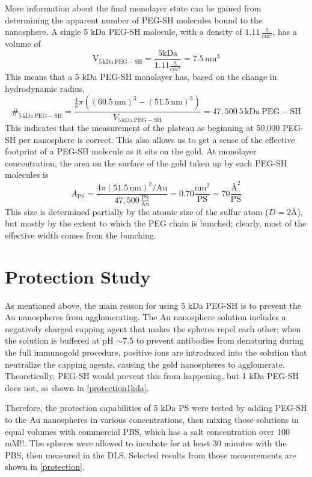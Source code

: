 More information about the final monolayer state can be gained from determining the apparent number of PEG-SH molecules bound to the nanosphere. A single 5 kDa PEG-SH molecule, with a density of $1.11\,\mathrm{\frac{g}{cm^3}}$, has a volume of
\[\mathrm{V_{5\,kDa\ PEG-SH}}
=\frac{5\mathrm{kDa}}{1.11\frac{\mathrm g}{\mathrm cm^3}}=7.5\mathrm{\,nm^3}\]
This means that a 5 kDa PEG-SH monolayer has, based on the change in hydrodynamic radius,
\[\#_{\mathrm{5\,kDa\ PEG-SH}}=
\frac{\frac{4}{3}\pi((60.5\mathrm{\,nm})^3-(51.5\mathrm{\,nm})^3)} {V_{\mathrm{5\,kDa\ PEG-SH}}}=47,500\mathrm{\ 5\,kDa\ PEG-SH}\]
This indicates that the measurement of the plateau as beginning at 50,000 PEG-SH per nanosphere is correct. This also allows us to get a sense of the effective footprint of a PEG-SH molecule as it sits on the gold. At monolayer concentration, the area on the surface of the gold taken up by each PEG-SH molecules is
\[A_{\mathrm{PS}}=\frac{4\pi(51.5\mathrm{\,nm})^2/\mathrm{Au}} {47,500\,\mathrm{\frac{PS}{Au}}}=0.70\frac{\mathrm{nm}^2}{\mathrm{PS}}=70\frac{\text{\AA}^2}{\mathrm{PS}}\]
This size is determined partially by the atomic size of the sulfur atom ($D=2\text{\AA}$), but mostly by the extent to which the PEG chain is bunched; clearly, most of the effective width comes from the bunching.

\section{Protection Study}
\label{protectionstudy}

As mentioned above, the main reason for using 5 kDa PEG-SH is to prevent the Au nanospheres from agglomerating. The Au nanosphere solution includes a negatively charged capping agent that makes the spheres repel each other; when the solution is buffered at pH \ensuremath{\sim}7.5 to prevent antibodies from denaturing during the full immunogold procedure, positive ions are introduced into the solution that neutralize the capping agents, causing the gold nanospheres to agglomerate. Theoretically, PEG-SH would prevent this from happening, but 1 kDa PEG-SH does not, as shown in \autoref{protection1kda}.

Therefore, the protection capabilities of 5 kDa PS were tested by adding PEG-SH to the Au nanospheres in various concentrations, then mixing those solutions in equal volumes with commercial PBS, which has a salt concentration over 100 mM!!. The spheres were allowed to incubate for at least 30 minutes with the PBS, then measured in the DLS. Selected results from those measurements are shown in \autoref{protection}.

